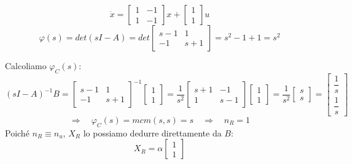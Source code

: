 \documentclass[../main.tex]{subfiles}
\begin{document}
		\begin{mdframed}[style=Exercise]
			\begin{Exercise}[title={Calcolare $ X_R $ e $ \varphi_C(s) $}, difficulty=1]
				\[
					\dot x =
					\begin{bmatrix}
						1 & -1\\
						1 & -1
					\end{bmatrix} x+
					\begin{bmatrix}
						1\\
						1
					\end{bmatrix} u
				\]
				\[
					\varphi(s) = det(sI-A) = det
					\begin{bmatrix}
						s-1 & 1\\
						-1 & s+1
					\end{bmatrix} =
					s^2 - 1 + 1 = s^2
				\]
				
				Calcoliamo $ \varphi_C(s) $:
				\[
					(sI-A)^{-1}B =
					\begin{bmatrix}
						s-1 & 1\\
						-1 & s+1
					\end{bmatrix}^{-1}
					\begin{bmatrix}
						1\\
						1
					\end{bmatrix} = \dfrac{1}{s^2}
					\begin{bmatrix}
						s+1 & -1\\
						1 & s-1
					\end{bmatrix}
					\begin{bmatrix}
						1\\
						1
					\end{bmatrix}= \dfrac{1}{s^2}
					\begin{bmatrix}
						s\\
						s
					\end{bmatrix} =
					\begin{bmatrix}
						\dfrac{1}{s}\\[.5cm]
						\dfrac{1}{s}
					\end{bmatrix}
				\]
				\[
					\Rightarrow\quad \varphi_C(s) = mcm\left( s, s \right) = s \quad\Rightarrow\quad n_R = 1
				\]
				Poich\'e $ n_R \equiv n_u $, $ X_R $ lo possiamo dedurre direttamente da $ B $:
				\[
					X_R = \alpha
					\begin{bmatrix}
						1\\
						1
					\end{bmatrix}
				\]
			\end{Exercise}
		\end{mdframed}
\end{document}
